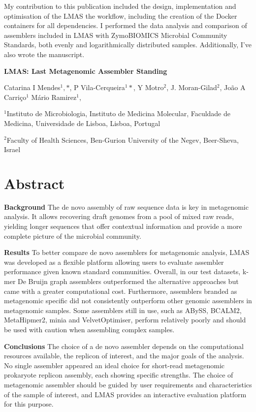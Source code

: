 My contribution to this publication included the design, implementation and optimisation of the LMAS the workflow, including the creation of the Docker containers for all dependencies. I performed the data analysis and comparison of assemblers included in LMAS with ZymoBIOMICS Microbial Community Standards, both evenly and logarithmically distributed samples. Additionally, I've also wrote the manuscript.

\cleardoublepage 

\begin{center}
\large
\textbf{LMAS: Last Metagenomic Assembler Standing}
\end{center}

Catarina I Mendes$^1,*$, 
P Vila-Cerqueira$^1*$,
Y Motro$^2$,
J. Moran-Gilad$^2$,
João A Carriço$^1$
Mário Ramirez$^1$, 


$^1$Instituto de Microbiologia, Instituto de Medicina Molecular, Faculdade de Medicina, Universidade de Lisboa, Lisboa, Portugal 

$^2$Faculty of Health Sciences, Ben-Gurion University of the Negev, Beer-Sheva, Israel

\section{Abstract}

\textbf{Background }The de novo assembly of raw sequence data is key in metagenomic analysis. It allows recovering draft genomes from a pool of mixed raw reads, yielding longer sequences that offer contextual information and provide a more complete picture of the microbial community.

\textbf{Results} To better compare de novo assemblers for metagenomic analysis, LMAS was developed as a flexible platform allowing users to evaluate assembler performance given known standard communities. Overall, in our test datasets, k-mer De Bruijn graph assemblers outperformed the alternative approaches but came with a greater computational cost. Furthermore, assemblers branded as metagenomic specific did not consistently outperform other genomic assemblers in metagenomic samples. Some assemblers still in use, such as ABySS, BCALM2, MetaHipmer2, minia and VelvetOptimiser, perform relatively poorly and should be used with caution when assembling complex samples. 

\textbf{Conclusions} The choice of a de novo assembler depends on the computational resources available, the replicon of interest, and the major goals of the analysis. No single assembler appeared an ideal choice for short-read metagenomic prokaryote replicon assembly, each showing specific strengths. The choice of metagenomic assembler should be guided by user requirements and characteristics of the sample of interest, and LMAS provides an interactive evaluation platform for this purpose. 

